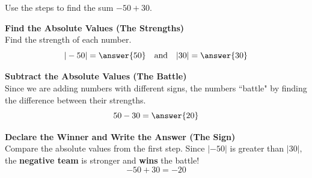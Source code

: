 \documentclass{ximera}[font=12pt]
\begin{document}
\begin{example} 
    
    Use the steps to find the sum $-50 + 30.$

    \begin{explanation}
    \begin{description}[style=multiline, leftmargin=5em, font=\bfseries]
        \item[Step 1:] \textbf{Find the Absolute Values (The Strengths)} \\
        Find the strength of each number.
        \[ |-50| = \answer{50} \quad \text{and} \quad |30| = \answer{30} \]

        \item[Step 2:] \textbf{Subtract the Absolute Values (The Battle)} \\
        Since we are adding numbers with different signs, the numbers ``battle" by finding the difference between their strengths.
        \[ 50 - 30 = \answer{20} \]

        \item[Step 3:] \textbf{Declare the Winner and Write the Answer (The Sign)} \\
        Compare the absolute values from the first step. Since $|-50|$ is greater than $|30|,$ the \textbf{negative team}
        is stronger and \textbf{wins} the battle!  
        \[ -50 + 30 = -20 \]
\end{description}
   \end{explanation}
\end{example}


\bigskip
\end{document}
